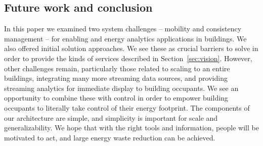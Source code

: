 \subsection{Future work and conclusion}
In this paper we examined two system challenges -- mobility and consistency management -- for enabling and energy 
analytics applications in buildings.  We also 
offered initial solution approaches.  We
see these as crucial barriers to solve in order to provide the kinds of services described in Section~\ref{sec:vision}.
However, other challenges remain, particularly those related to scaling to an entire buildings, integrating
many more streaming data sources, and providing streaming analytics for immediate display to building occupants.
We see an opportunity to combine these with control in order to empower building occupants to literally take
control of their energy footprint.  The components of our architecture are simple, and simplicity is important for scale and
generalizability.  We hope that with the right tools and information, people will be motivated to act, and large
energy waste reduction can be achieved.